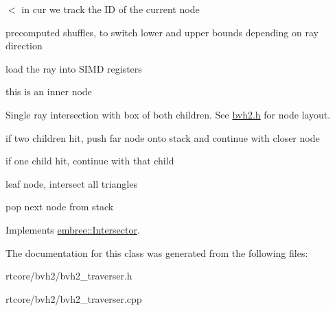 $<$ in cur we track the ID of the current node

precomputed shuffles, to switch lower and upper bounds depending on ray direction

load the ray into SIMD registers

this is an inner node

Single ray intersection with box of both children. See \hyperlink{bvh2_8h_source}{bvh2.h} for node layout.

if two children hit, push far node onto stack and continue with closer node

if one child hit, continue with that child

leaf node, intersect all triangles

pop next node from stack 



Implements \hyperlink{classembree_1_1_intersector_a47cf036c3eab7060590c72e7bb51255c}{embree::Intersector}.



The documentation for this class was generated from the following files:\begin{DoxyCompactItemize}
\item 
rtcore/bvh2/bvh2\_\-traverser.h\item 
rtcore/bvh2/bvh2\_\-traverser.cpp\end{DoxyCompactItemize}
